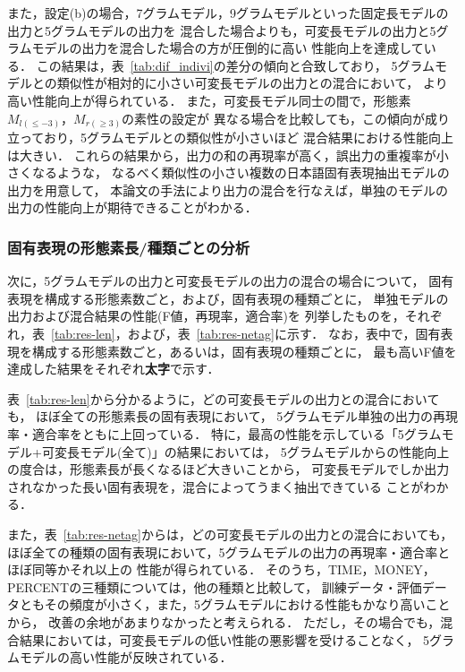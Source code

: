 また，設定(b)の場合，7グラムモデル，9グラムモデルといった固定長モデルの出力と5グラムモデルの出力を
混合した場合よりも，可変長モデルの出力と5グラムモデルの出力を混合した場合の方が圧倒的に高い
性能向上を達成している．
この結果は，表~\ref{tab:dif_indivi}の差分の傾向と合致しており，
5グラムモデルとの類似性が相対的に小さい可変長モデルの出力との混合において，
より高い性能向上が得られている．
また，可変長モデル同士の間で，形態素$M_{l(\leq -3)}$，$M_{r(\geq 3)}$の素性の設定が
異なる場合を比較しても，この傾向が成り立っており，5グラムモデルとの類似性が小さいほど
混合結果における性能向上は大きい．
これらの結果から，出力の和の再現率が高く，誤出力の重複率が小さくなるような，
なるべく類似性の小さい複数の日本語固有表現抽出モデルの出力を用意して，
本論文の手法により出力の混合を行なえば，単独のモデルの出力の性能向上が期待できることがわかる．



\subsubsection{固有表現の形態素長/種類ごとの分析}

次に，5グラムモデルの出力と可変長モデルの出力の混合の場合について，
固有表現を構成する形態素数ごと，および，固有表現の種類ごとに，
単独モデルの出力および混合結果の性能(F値，再現率，適合率)を
列挙したものを，それぞれ，表~\ref{tab:res-len}，および，表~\ref{tab:res-netag}に示す．
なお，表中で，固有表現を構成する形態素数ごと，あるいは，固有表現の種類ごとに，
最も高いF値を達成した結果をそれぞれ{\bf 太字}で示す．

表~\ref{tab:res-len}から分かるように，どの可変長モデルの出力との混合においても，
ほぼ全ての形態素長の固有表現において，
5グラムモデル単独の出力の再現率・適合率をともに上回っている．
特に，最高の性能を示している「5グラムモデル+可変長モデル(全て)」の結果においては，
5グラムモデルからの性能向上の度合は，形態素長が長くなるほど大きいことから，
可変長モデルでしか出力されなかった長い固有表現を，混合によってうまく抽出できている
ことがわかる．

また，表~\ref{tab:res-netag}からは，どの可変長モデルの出力との混合においても，
ほぼ全ての種類の固有表現において，5グラムモデルの出力の再現率・適合率とほぼ同等かそれ以上の
性能が得られている．
そのうち，TIME，MONEY，PERCENTの三種類については，他の種類と比較して，
訓練データ・評価データともその頻度が小さく，また，5グラムモデルにおける性能もかなり高いことから，
改善の余地があまりなかったと考えられる．
ただし，その場合でも，混合結果においては，可変長モデルの低い性能の悪影響を受けることなく，
5グラムモデルの高い性能が反映されている．





